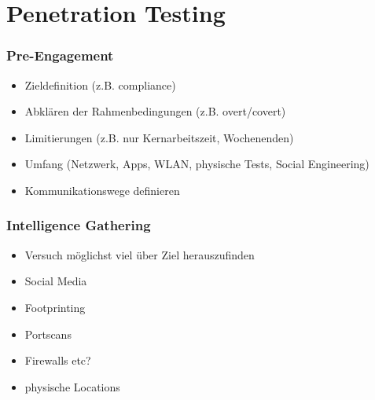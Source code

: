 \documentclass[11pt]{beamer}
\begin{document}
\section{Penetration Testing}
\label{sec-2}
\begin{frame}[fragile]\frametitle{Pre-Engagement}
\label{sec-2-1}
\begin{itemize}

\item Zieldefinition (z.B. compliance)\\
\label{sec-2-1-1}%
\item Abklären der Rahmenbedingungen (z.B. overt/covert)\\
\label{sec-2-1-2}%
\item Limitierungen (z.B. nur Kernarbeitszeit, Wochenenden)\\
\label{sec-2-1-3}%
\item Umfang (Netzwerk, Apps, WLAN, physische Tests, Social Engineering)\\
\label{sec-2-1-4}%
\item Kommunikationswege definieren\\
\label{sec-2-1-5}%
\end{itemize} %
\end{frame}
\begin{frame}[fragile]\frametitle{Intelligence Gathering}
\label{sec-2-2}
\begin{itemize}

\item Versuch möglichst viel über Ziel herauszufinden\\
\label{sec-2-2-1}%
\item Social Media\\
\label{sec-2-2-2}%
\item Footprinting\\
\label{sec-2-2-3}%
\item Portscans\\
\label{sec-2-2-4}%
\item Firewalls etc?\\
\label{sec-2-2-5}%
\item physische Locations\\
\label{sec-2-2-6}%
\end{itemize} %
\end{frame}
\end{document}
